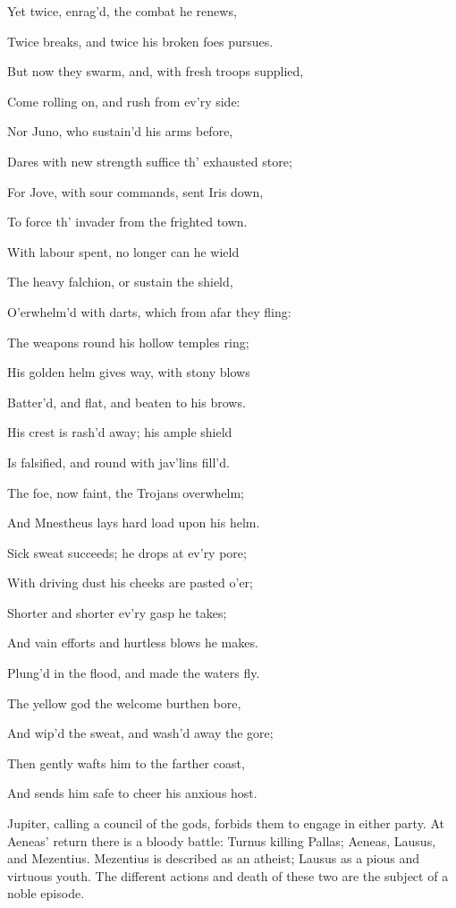Yet twice, enrag’d, the combat he renews,

Twice breaks, and twice his broken foes pursues.

But now they swarm, and, with fresh troops supplied,

Come rolling on, and rush from ev’ry side:

Nor Juno, who sustain’d his arms before,

Dares with new strength suffice th’ exhausted store;

For Jove, with sour commands, sent Iris down,

To force th’ invader from the frighted town.

With labour spent, no longer can he wield

The heavy falchion, or sustain the shield,

O’erwhelm’d with darts, which from afar they fling:

The weapons round his hollow temples ring;

His golden helm gives way, with stony blows

Batter’d, and flat, and beaten to his brows.

His crest is rash’d away; his ample shield

Is falsified, and round with jav’lins fill’d.

The foe, now faint, the Trojans overwhelm;

And Mnestheus lays hard load upon his helm.

Sick sweat succeeds; he drops at ev’ry pore;

With driving dust his cheeks are pasted o’er;

Shorter and shorter ev’ry gasp he takes;

And vain efforts and hurtless blows he makes.

Plung’d in the flood, and made the waters fly.

The yellow god the welcome burthen bore,

And wip’d the sweat, and wash’d away the gore;

Then gently wafts him to the farther coast,

And sends him safe to cheer his anxious host.


Jupiter, calling a council of the gods, forbids them to engage in either party.
At Aeneas’ return there is a bloody battle: Turnus killing Pallas;
Aeneas, Lausus, and Mezentius. Mezentius is described as an atheist; Lausus
as a pious and virtuous youth. The different actions and death of these two
are the subject of a noble episode.

